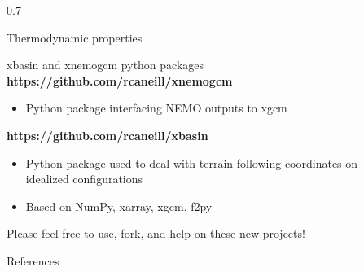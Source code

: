 \documentclass[final]{beamer}
\newlength{\sepwidth}
\newlength{\colwidth}
\newcommand{\separatorcolumn}{\begin{column}{\sepwidth}\end{column}}
\begin{document}
\begin{frame}[t]
\begin{columns}[t]
\begin{column}{0.7\colwidth}
\begin{alertblock}{Thermodynamic properties}
  \end{alertblock}

  
  \begin{alertblock}{xbasin and xnemogcm python packages}
    \textbf{https://github.com/rcaneill/xnemogcm}
    \begin{itemize}
    \item Python package interfacing NEMO outputs to xgcm
    \end{itemize}
    
    \textbf{https://github.com/rcaneill/xbasin}
    \begin{itemize}
    \item Python package used to deal with terrain-following coordinates
      on idealized configurations
    \item Based on NumPy, xarray, xgcm, f2py
    \end{itemize}

    Please feel free to use, fork, and help on these new projects!
  \end{alertblock}

  
  \begin{block}{References}

    
    \footnotesize{
      
      }

  \end{block}

\end{column}

\separatorcolumn
\end{columns}
\end{frame}
\end{document}
